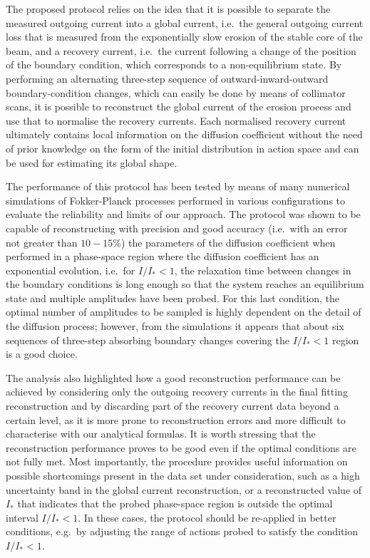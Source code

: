 The proposed protocol relies on the idea that it is possible to separate the measured outgoing current into a global current, i.e.\ the general outgoing current loss that is measured from the exponentially slow erosion of the stable core of the beam, and a recovery current, i.e.\ the current following a change of the position of the boundary condition, which corresponds to a non-equilibrium state. By performing an alternating three-step sequence of outward-inward-outward boundary-condition changes, which can easily be done by means of collimator scans, it is possible to reconstruct the global current of the erosion process and use that to normalise the recovery currents. Each normalised recovery current ultimately contains local information on the diffusion coefficient without the need of prior knowledge on the form of the initial distribution in action space and can be used for estimating its global shape.

The performance of this protocol has been tested by means of many numerical simulations of Fokker-Planck processes performed in various configurations to evaluate the reliability and limits of our approach. The protocol was shown to be capable of reconstructing with precision and good accuracy  {(i.e.\ with an error not greater than $10-15\%$)} the parameters of the diffusion coefficient when performed in a phase-space region where the diffusion coefficient has an exponential evolution, i.e.\ for $I/I_\ast < 1$, the relaxation time between changes in the boundary conditions is long enough so that the system reaches an equilibrium state and multiple amplitudes have been probed. For this last condition, the optimal number of amplitudes to be sampled is highly dependent on the detail of the diffusion process; however, from the simulations it appears that about six sequences of three-step absorbing boundary changes covering the $I / I_\ast < 1$ region is a good choice. 

The analysis also highlighted how a good reconstruction performance can be achieved by considering only the outgoing recovery currents in the final fitting reconstruction and by discarding part of the recovery current data beyond a certain level, as it is more prone to reconstruction errors and more difficult to characterise with our analytical formulas. It is worth stressing that the reconstruction performance proves to be good even if the optimal conditions are not fully met. Most importantly, the procedure provides useful information on possible shortcomings present in the data set under consideration, such as a high uncertainty band in the global current reconstruction, or a reconstructed value of $I_\ast$ that indicates that the probed phase-space region is outside the optimal interval $I / I_\ast < 1$. In these cases, the protocol should be re-applied in better conditions, e.g.\ by adjusting the range of actions probed to satisfy the condition $I / I_\ast < 1$.

